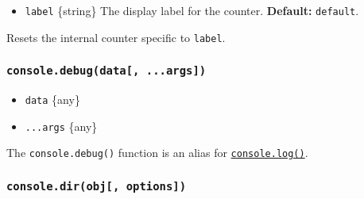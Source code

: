 \begin{itemize}
\tightlist
\item
  \texttt{label} \{string\} The display label for the counter.
  \textbf{Default:}
  \texttt{\textquotesingle{}default\textquotesingle{}}.
\end{itemize}

Resets the internal counter specific to \texttt{label}.

\begin{Shaded}
\begin{Highlighting}[]
\OperatorTok{\textgreater{}} \NormalTok{(}\NormalTok{)}\OperatorTok{;}
\OperatorTok{:} 
\OperatorTok{\textgreater{}} \NormalTok{(}\NormalTok{)}\OperatorTok{;}
\OperatorTok{\textgreater{}} \NormalTok{(}\NormalTok{)}\OperatorTok{;}
\OperatorTok{:} 
\OperatorTok{\textgreater{}}
\end{Highlighting}
\end{Shaded}

\subsubsection{\texorpdfstring{\texttt{console.debug(data{[},\ ...args{]})}}{console.debug(data{[}, ...args{]})}}\label{console.debugdata-...args}

\begin{itemize}
\tightlist
\item
  \texttt{data} \{any\}
\item
  \texttt{...args} \{any\}
\end{itemize}

The \texttt{console.debug()} function is an alias for
\hyperref[consolelogdata-args]{\texttt{console.log()}}.

\subsubsection{\texorpdfstring{\texttt{console.dir(obj{[},\ options{]})}}{console.dir(obj{[}, options{]})}}\label{console.dirobj-options}

